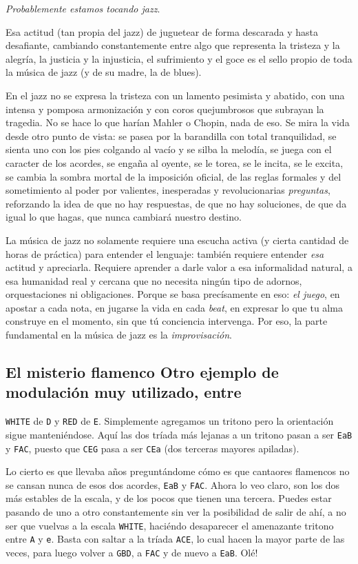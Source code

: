 \documentclass[]{article}
\begin{document}
\emph{Probablemente estamos tocando jazz}.

Esa actitud (tan propia del jazz) de juguetear de forma descarada y hasta desafiante, cambiando constantemente entre algo que representa la tristeza y la alegría, la justicia y la injusticia, el sufrimiento y el goce es el sello propio de toda la música de jazz (y de su madre, la de blues).

En el jazz no se expresa la tristeza con un lamento pesimista y abatido, con una intensa y pomposa armonización y con coros quejumbrosos que subrayan la tragedia. No se hace lo que harían Mahler o Chopin, nada de eso. Se mira la vida desde otro punto de vista: se pasea por la barandilla con total tranquilidad, se sienta uno con los pies colgando al vacío y se silba la melodía, se juega con el caracter de los acordes, se engaña al oyente, se le torea, se le incita, se le excita, se cambia la sombra mortal de la imposición oficial, de las reglas formales y del sometimiento al poder por valientes, inesperadas y revolucionarias \emph{preguntas}, reforzando la idea de que no hay respuestas, de que no hay soluciones, de que da igual lo que hagas, que nunca cambiará nuestro destino.

La música de jazz no solamente requiere una escucha activa (y cierta cantidad de horas de práctica) para entender el lenguaje: también requiere entender \emph{esa} actitud y apreciarla. Requiere aprender a darle valor a esa informalidad natural, a esa humanidad real y cercana que no necesita ningún tipo de adornos, orquestaciones ni obligaciones. Porque se basa precísamente en eso: \emph{el juego}, en apostar a cada nota, en jugarse la vida en cada \emph{beat}, en expresar lo que tu alma construye en el momento, sin que tú conciencia intervenga. Por eso, la parte fundamental en la música de jazz es la \emph{improvisación}.

\subsection{El misterio flamenco Otro ejemplo de modulación muy utilizado, entre} \texttt{WHITE} de \texttt{D} y \texttt{RED} de \texttt{E}. Simplemente agregamos un tritono pero la orientación sigue manteniéndose. Aquí las dos tríada más lejanas a un tritono pasan a ser \texttt{EaB} y \texttt{FAC}, puesto que \texttt{CEG} pasa a ser \texttt{CEa} (dos terceras mayores apiladas).

Lo cierto es que llevaba años preguntándome cómo es que cantaores flamencos no se cansan nunca de esos dos acordes, \texttt{EaB} y \texttt{FAC}. Ahora lo veo claro, son los dos más estables de la escala, y de los pocos que tienen una tercera. Puedes estar pasando de uno a otro constantemente sin ver la posibilidad de salir de ahí, a no ser que vuelvas a la escala \texttt{WHITE}, haciéndo desaparecer el amenazante tritono entre \texttt{A} y \texttt{e}. Basta con saltar a la tríada \texttt{ACE}, lo cual hacen la mayor parte de las veces, para luego volver a \texttt{GBD}, a \texttt{FAC} y de nuevo a \texttt{EaB}. Olé!
\end{document}
